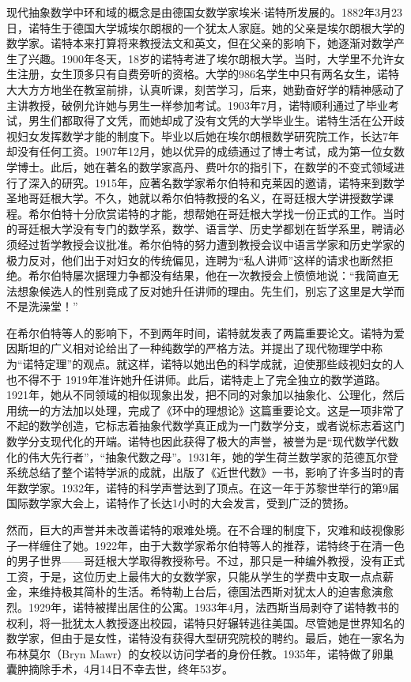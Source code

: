 \documentclass[b5paper]{ctexart}
\begin{document}
现代抽象数学中环和域的概念是由德国女数学家埃米$\cdot$诺特所发展的。1882年3月23日，诺特生于德国大学城埃尔朗根的一个犹太人家庭。她的父亲是埃尔朗根大学的数学家。诺特本来打算将来教授法文和英文，但在父亲的影响下，她逐渐对数学产生了兴趣。1900年冬天，18岁的诺特考进了埃尔朗根大学。当时，大学里不允许女生注册，女生顶多只有自费旁听的资格。大学的986名学生中只有两名女生，诺特大大方方地坐在教室前排，认真听课，刻苦学习，后来，她勤奋好学的精神感动了主讲教授，破例允许她与男生一样参加考试。1903年7月，诺特顺利通过了毕业考试，男生们都取得了文凭，而她却成了没有文凭的大学毕业生。诺特生活在公开歧视妇女发挥数学才能的制度下。毕业以后她在埃尔朗根数学研究院工作，长达7年却没有任何工资。1907年12月，她以优异的成绩通过了博士考试，成为第一位女数学博士。此后，她在著名的数学家高丹、费叶尔的指引下，在数学的不变式领域进行了深入的研究。1915年，应著名数学家希尔伯特和克莱因的邀请，诺特来到数学圣地哥廷根大学。不久，她就以希尔伯特教授的名义，在哥廷根大学讲授数学课程。希尔伯特十分欣赏诺特的才能，想帮她在哥廷根大学找一份正式的工作。当时的哥廷根大学没有专门的数学系，数学、语言学、历史学都划在哲学系里，聘请必须经过哲学教授会议批准。希尔伯特的努力遭到教授会议中语言学家和历史学家的极力反对，他们出于对妇女的传统偏见，连聘为“私人讲师”这样的请求也断然拒绝。希尔伯特屡次据理力争都没有结果，他在一次教授会上愤愤地说：“我简直无法想象候选人的性别竟成了反对她升任讲师的理由。先生们，别忘了这里是大学而不是洗澡堂！”

在希尔伯特等人的影响下，不到两年时间，诺特就发表了两篇重要论文。诺特为爱因斯坦的广义相对论给出了一种纯数学的严格方法。并提出了现代物理学中称为“诺特定理”的观点。就这样，诺特以她出色的科学成就，迫使那些歧视妇女的人也不得不于 1919年准许她升任讲师。此后，诺特走上了完全独立的数学道路。1921年，她从不同领域的相似现象出发，把不同的对象加以抽象化、公理化，然后用统一的方法加以处理，完成了《环中的理想论》这篇重要论文。这是一项非常了不起的数学创造，它标志着抽象代数学真正成为一门数学分支，或者说标志着这门数学分支现代化的开端。诺特也因此获得了极大的声誉，被誉为是“现代数学代数化的伟大先行者”，“抽象代数之母”。1931年，她的学生荷兰数学家的范德瓦尔登系统总结了整个诺特学派的成就，出版了《近世代数》一书，影响了许多当时的青年数学家。1932年，诺特的科学声誉达到了顶点。在这一年于苏黎世举行的第9届国际数学家大会上，诺特作了长达1小时的大会发言，受到广泛的赞扬。

然而，巨大的声誉并未改善诺特的艰难处境。在不合理的制度下，灾难和歧视像影子一样缠住了她。1922年，由于大数学家希尔伯特等人的推荐，诺特终于在清一色的男子世界——哥廷根大学取得教授称号。不过，那只是一种编外教授，没有正式工资，于是，这位历史上最伟大的女数学家，只能从学生的学费中支取一点点薪金，来维持极其简朴的生活。希特勒上台后，德国法西斯对犹太人的迫害愈演愈烈。1929年，诺特被撵出居住的公寓。1933年4月，法西斯当局剥夺了诺特教书的权利，将一批犹太人教授逐出校园，诺特只好辗转逃往美国。尽管她是世界知名的数学家，但由于是女性，诺特没有获得大型研究院校的聘约。最后，她在一家名为布林莫尔（Bryn Mawr）的女校以访问学者的身份任教。1935年，诺特做了卵巢囊肿摘除手术，4月14日不幸去世，终年53岁。
\end{document}
